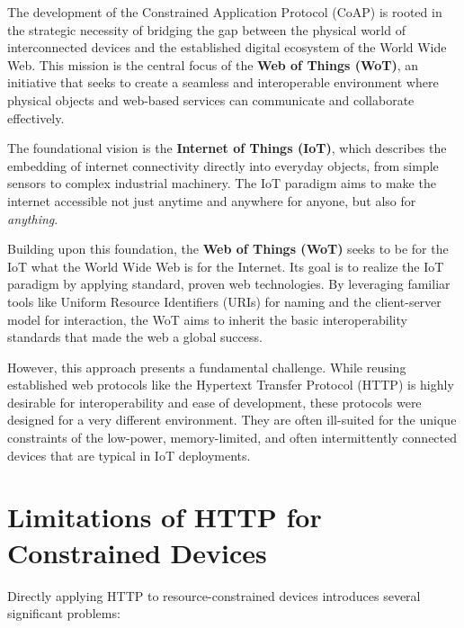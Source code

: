 \documentclass{scrbook}
\begin{document}
The development of the Constrained Application Protocol (CoAP) is rooted in the strategic necessity of bridging the gap between the physical world of interconnected devices and the established digital ecosystem of the World Wide Web. This mission is the central focus of the \textbf{Web of Things (WoT)}, an initiative that seeks to create a seamless and interoperable environment where physical objects and web-based services can communicate and collaborate effectively.


The foundational vision is the \textbf{Internet of Things (IoT)}, which describes the embedding of internet connectivity directly into everyday objects, from simple sensors to complex industrial machinery. The IoT paradigm aims to make the internet accessible not just anytime and anywhere for anyone, but also for \textit{anything}.

Building upon this foundation, the \textbf{Web of Things (WoT)} seeks to be for the IoT what the World Wide Web is for the Internet. Its goal is to realize the IoT paradigm by applying standard, proven web technologies. By leveraging familiar tools like Uniform Resource Identifiers (URIs) for naming and the client-server model for interaction, the WoT aims to inherit the basic interoperability standards that made the web a global success.

However, this approach presents a fundamental challenge. While reusing established web protocols like the Hypertext Transfer Protocol (HTTP) is highly desirable for interoperability and ease of development, these protocols were designed for a very different environment. They are often ill-suited for the unique constraints of the low-power, memory-limited, and often intermittently connected devices that are typical in IoT deployments.

\section{Limitations of HTTP for Constrained Devices}

Directly applying HTTP to resource-constrained devices introduces several significant problems:
\end{document}
